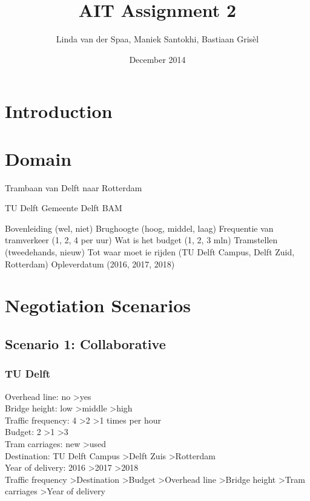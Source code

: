 \documentclass{article}
\title{AIT Assignment 2}
\author{Linda van der Spaa, Maniek Santokhi, Bastiaan Gris\`el}
\date{December 2014}
\begin{document}
\maketitle

\section{Introduction}

\section{Domain}
Trambaan van Delft naar Rotterdam

TU Delft
Gemeente Delft
BAM

Bovenleiding (wel, niet)
Brughoogte (hoog, middel, laag)
Frequentie van tramverkeer (1, 2, 4 per uur)
Wat is het budget (1, 2, 3 mln)
Tramstellen (tweedehands, nieuw)
Tot waar moet ie rijden (TU Delft Campus, Delft Zuid, Rotterdam)
Opleverdatum (2016, 2017, 2018)

\section{Negotiation Scenarios}

\subsection{Scenario 1: Collaborative}

\subsubsection*{TU Delft}
Overhead line: no \textgreater yes \\
Bridge height: low \textgreater middle \textgreater high \\
Traffic frequency: 4 \textgreater 2 \textgreater 1 times per hour \\
Budget: 2 \textgreater 1 \textgreater 3 \\
Tram carriages: new \textgreater used \\
Destination: TU Delft Campus \textgreater Delft Zuis \textgreater Rotterdam \\
Year of delivery: 2016 \textgreater 2017 \textgreater 2018 \\

Traffic frequency \textgreater Destination \textgreater Budget \textgreater Overhead line \textgreater Bridge height \textgreater Tram carriages \textgreater Year of delivery
\end{document}
